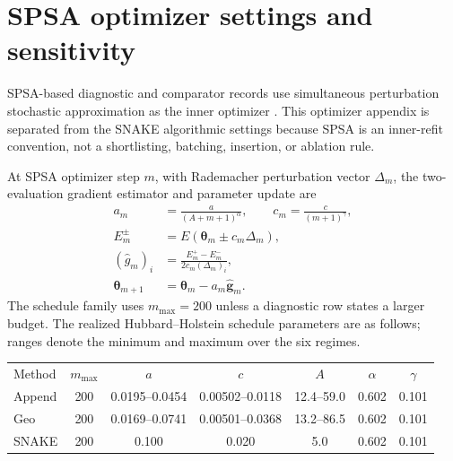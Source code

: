 \documentclass[
  reprint,
  amsmath,
  amssymb,
  aps,
  pra,
  nofootinbib,
  superscriptaddress,
  floatfix
]{revtex4-2}
\begin{document}
\section{SPSA optimizer settings and sensitivity}
\label{app:spsa_settings}

SPSA-based diagnostic and comparator records use simultaneous perturbation
stochastic approximation as the inner optimizer
\cite{Spall1992SPSA,Kandala2017}. This optimizer appendix is separated from
the SNAKE algorithmic settings because SPSA is an inner-refit convention, not a
shortlisting, batching, insertion, or ablation rule.

At SPSA optimizer step \(m\), with Rademacher perturbation vector
\(\Delta_m\), the two-evaluation gradient estimator and parameter update are
\begin{align*}
a_m&=\frac{a}{(A+m+1)^\alpha},\qquad
c_m=\frac{c}{(m+1)^\gamma}, \nonumber\\
E_m^\pm&=E(\boldsymbol{\theta}_m\pm c_m\Delta_m), \nonumber\\
(\widehat g_m)_i&=\frac{E_m^+-E_m^-}{2c_m(\Delta_m)_i}, \nonumber\\
\boldsymbol{\theta}_{m+1}&=\boldsymbol{\theta}_m-a_m\widehat{\mathbf g}_m .
\end{align*}
The schedule family uses \(m_{\max}=200\) unless a diagnostic row states a
larger budget. The realized Hubbard--Holstein schedule parameters are as
follows; ranges denote the minimum and maximum over the six regimes.
\begin{center}
\scriptsize
\setlength{\tabcolsep}{1.4pt}
\renewcommand{\arraystretch}{1.05}
\begin{tabular}{lcccccc}
Method & \(m_{\max}\) & \(a\) & \(c\) & \(A\) & \(\alpha\) & \(\gamma\)\\
Append & 200 & 0.0195--0.0454 & 0.00502--0.0118 & 12.4--59.0 & 0.602 & 0.101\\
Geo & 200 & 0.0169--0.0741 & 0.00501--0.0368 & 13.2--86.5 & 0.602 & 0.101\\
SNAKE & 200 & 0.100 & 0.020 & 5.0 & 0.602 & 0.101\\
\end{tabular}
\end{center}
\end{document}
